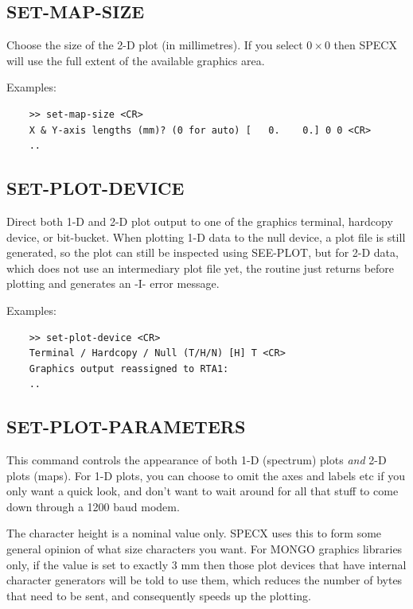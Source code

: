 \documentclass[11pt,twoside]{report}
\begin{document}
\subsection{SET-MAP-SIZE} 

Choose the size of the 2-D plot (in millimetres). If you select $0\times 0$
then SPECX will use the full extent of the available graphics area.

Examples:
\begin{verbatim}
    >> set-map-size <CR>
    X & Y-axis lengths (mm)? (0 for auto) [   0.    0.] 0 0 <CR>
    ..
\end{verbatim}

\subsection{SET-PLOT-DEVICE} 

Direct both 1-D and 2-D plot output to one of the graphics terminal, 
hardcopy device, or bit-bucket. 
When plotting 1-D data to the null device, 
a plot file is still
generated, so the plot can still 
be inspected using SEE-PLOT, but 
for 2-D data, which does not use an
intermediary plot file yet, the routine just returns before plotting
and generates an -I- error message.

Examples:
\begin{verbatim}
    >> set-plot-device <CR>
    Terminal / Hardcopy / Null (T/H/N) [H] T <CR>
    Graphics output reassigned to RTA1:
    ..
\end{verbatim}

\subsection{SET-PLOT-PARAMETERS} 

This command controls the appearance of both 1-D (spectrum) plots {\em and} 2-D
plots (maps). For 1-D plots, you can choose to omit the axes and labels etc if
 you only want a quick look, and don't want
to wait around for all that stuff to come down through a 1200 baud modem. 

The character height  is a nominal value
only. SPECX uses this to form some general opinion of what size characters you
want. For MONGO graphics libraries only, if the value is set to exactly 3 mm
then those plot devices that have internal character generators will be told to
use them, which reduces the number of bytes that need to be sent, and
consequently speeds up the plotting. 
\end{document}
